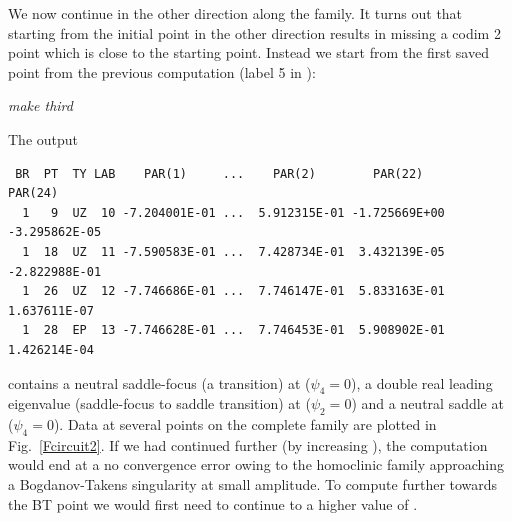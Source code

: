\documentclass[12pt]{report}
\begin{document}
We now continue in the other direction along the family. It turns out
that starting from the initial point in the other direction results in
missing a codim 2 point which is close to the starting point. Instead we
start from the first saved point from the previous computation
(label 5 in ):
\begin{center}
\it make third
\end{center}
The output
\begin{verbatim}
 BR  PT  TY LAB    PAR(1)     ...    PAR(2)        PAR(22)       PAR(24)    
  1   9  UZ  10 -7.204001E-01 ...  5.912315E-01 -1.725669E+00 -3.295862E-05
  1  18  UZ  11 -7.590583E-01 ...  7.428734E-01  3.432139E-05 -2.822988E-01
  1  26  UZ  12 -7.746686E-01 ...  7.746147E-01  5.833163E-01  1.637611E-07
  1  28  EP  13 -7.746628E-01 ...  7.746453E-01  5.908902E-01  1.426214E-04
\end{verbatim}
contains a neutral saddle-focus (a  transition) 
at  ($\psi_4=0$), a double real leading eigenvalue 
(saddle-focus to saddle transition) at  ($\psi_2=0$) 
and a neutral saddle at  ($\psi_4=0$). Data at several
points on the complete family are plotted in Fig.\ \ref{Fcircuit2}.
If we had continued further (by increasing ), 
the computation would end at a no convergence error  owing 
to the homoclinic family approaching a Bogdanov-Takens singularity 
at small amplitude. To compute further towards the BT point 
we would first need to continue to a higher value of .
\end{document}
